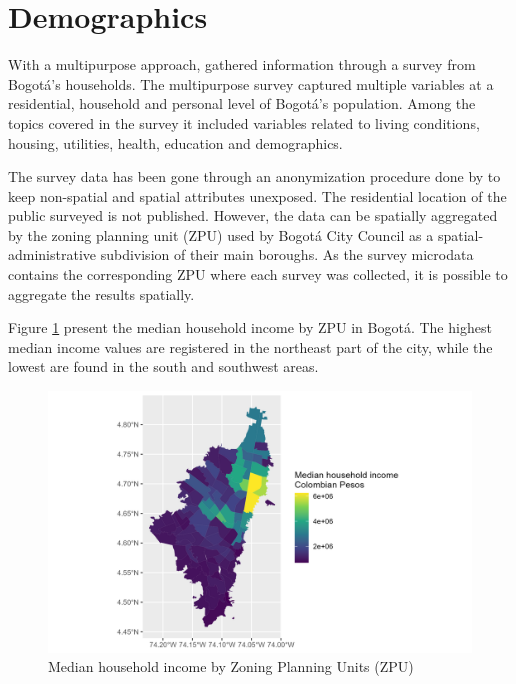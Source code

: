 \documentclass[12pt, a4paper]{report}
\begin{document}
\section{Demographics}


With a multipurpose approach, \cite{secretariadistritaldeplaneacionCapaGeograficaEncuesta2023} gathered information through a survey from Bogotá's households. The multipurpose survey captured multiple variables at a residential, household and personal level of Bogotá's population. Among the topics covered in the survey it included variables related to living conditions, housing, utilities, health, education and demographics.

The survey data has been gone through an anonymization procedure done by \cite{secretariadistritaldeplaneacionMicrodatosEncuestaMultiproposito2023} to keep non-spatial and spatial attributes unexposed. The residential location of the public surveyed is not published. However, the data can be spatially aggregated by the zoning planning unit (ZPU) used by Bogotá City Council as a spatial-administrative subdivision of their main boroughs. As the survey microdata contains the corresponding ZPU where each survey was collected, it is possible to aggregate the results spatially. 

Figure \ref{fig:Demo_Income_ZPU} present the median household income by ZPU in Bogotá. The highest median income values are registered in the northeast part of the city, while the lowest are found in the south and southwest areas.

\begin{figure}[H]
    \centering
    \includegraphics[width=15cm]{Data/Results/Images/Demo_Income_UPZ_Mean_Median.png}
    \caption{Median household income by Zoning Planning Units (ZPU) \citep{secretariadistritaldeplaneacionMicrodatosEncuestaMultiproposito2023, secretariadistritaldeplaneacionCapaGeograficaEncuesta2023} }
    \label{fig:Demo_Income_ZPU}
\end{figure}
\end{document}
